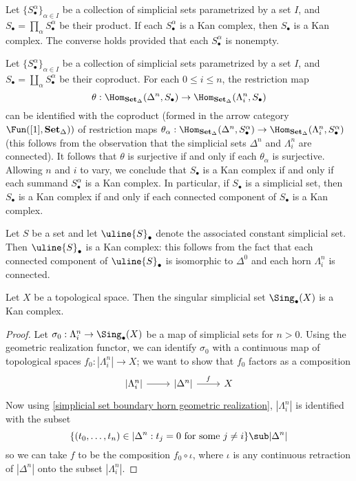 \begin{example}\label{simplicial set product of Kan}
Let $\{S_\bullet^\alpha\}_{\alpha\in I}$ be a collection of simplicial sets parametrized by a set $I$, and $S_\bullet=\prod_{\alpha}S_\bullet^\alpha$ be their product. If each $S_\bullet^\alpha$ is a Kan complex, then $S_\bullet$ is a Kan complex. The converse holds provided that each $S_\bullet^\alpha$ is nonempty.
\end{example}
\begin{example}\label{simplicial set coproduct of Kan}
Let $\{S_\bullet^\alpha\}_{\alpha\in I}$ be a collection of simplicial sets parametrized by a set $I$, and $S_\bullet=\coprod_{\alpha}S_\bullet^\alpha$ be their coproduct. For each $0\leq i\leq n$, the restriction map
\[\theta:\Hom_{\mathbf{Set}_\Delta}(\Delta^n,S_\bullet)\to\Hom_{\mathbf{Set}_\Delta}(\Lambda_i^n,S_\bullet)\]
can be identified with the coproduct (formed in the arrow category $\Fun([1],\mathbf{Set}_\Delta))$ of restriction maps $\theta_\alpha:\Hom_{\mathbf{Set}_\Delta}(\Delta^n,S_\bullet^\alpha)\to\Hom_{\mathbf{Set}_\Delta}(\Lambda^n_i,S_\bullet^\alpha)$ (this follows from the observation that
the simplicial sets $\Delta^n$ and $\Lambda_i^n$ are connected). It follows that $\theta$ is surjective if and only if each $\theta_\alpha$ is surjective. Allowing $n$ and $i$ to vary, we conclude that $S_\bullet$ is a Kan complex if and only if each summand $S_\bullet^\alpha$ is a Kan complex. In particular, if $S_\bullet$ is a simplicial set, then $S_\bullet$ is a Kan complex if and only if each connected component of $S_\bullet$ is a Kan complex.
\end{example}
\begin{example}\label{simplicial set constant is Kan}
Let $S$ be a set and let $\uline{S}_\bullet$ denote the associated constant simplicial set. Then $\uline{S}_\bullet$ is a Kan complex: this follows from the fact that each connected component of $\uline{S}_\bullet$ is isomorphic to $\Delta^0$ and each horn $\Lambda^n_i$ is connected.
\end{example}
\begin{proposition}\label{simplicial set singular is Kan}
Let $X$ be a topological space. Then the singular simplicial set $\Sing_\bullet(X)$ is a Kan complex.
\end{proposition}
\begin{proof}
Let $\sigma_0:\Lambda_i^n\to\Sing_\bullet(X)$ be a map of simplicial sets for $n>0$. Using the geometric realization functor, we can identify $\sigma_0$ with a continuous map of topological spaces $f_0:|\Lambda^n_i|\to X$; we want to show that $f_0$ factors as a composition
\[\begin{tikzcd}
{|\Lambda^n_i|}\ar[r]&{|\Delta^n|}\ar[r,"f"]&X
\end{tikzcd}\]
Now using \cref{simplicial set boundary horn geometric realization}, $|\Lambda^n_i|$ is identified with the subset
\[\{(t_0,\dots,t_n)\in|\Delta^n:\text{$t_j=0$ for some $j\neq i$}\}\sub|\Delta^n|\]
so we can take $f$ to be the composition $f_0\circ\iota$, where $\iota$ is any continuous retraction of $|\Delta^n|$ onto the subset $|\Lambda^n_i|$.
\end{proof}
